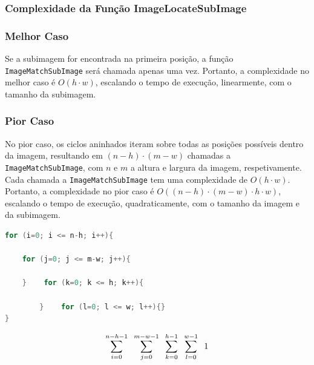\documentclass{report}
\begin{document}
\subsubsection{Complexidade da Função ImageLocateSubImage}

\subsubsection{Melhor Caso}
Se a subimagem for encontrada na primeira posição, a função \texttt{ImageMatchSubImage} será chamada apenas uma vez. 
Portanto, a complexidade no melhor caso é \(O(h \cdot w)\), escalando o tempo de execução, linearmente, com o tamanho da subimagem.

\subsubsection{Pior Caso}
No pior caso, os ciclos aninhados iteram sobre todas as posições possíveis dentro da imagem, 
resultando em \((n-h) \cdot (m-w)\) chamadas a \texttt{ImageMatchSubImage}, com \(n\) e \(m\) a altura e largura da imagem, respetivamente. 
Cada chamada a \texttt{ImageMatchSubImage} tem uma complexidade de \(O(h \cdot w)\).
Portanto, a complexidade no pior caso é \(O((n-h) \cdot (m-w) \cdot h \cdot w)\), escalando o tempo de execução, quadraticamente, 
com o tamanho da imagem e da subimagem.

\vspace{5mm}

\begingroup
\begin{lstlisting}[language=C]
for (i=0; i <= n-h; i++){
    
    for (j=0; j <= m-w; j++){
            
    }    for (k=0; k <= h; k++){
            
        }    for (l=0; l <= w; l++){}
}
\end{lstlisting}
\endgroup

\vspace{5mm}

\begin{equation}
     \sum_{i=0}^{n-h-1}  \hspace{2mm} \sum_{j=0}^{m-w-1}  \hspace{2mm} \sum_{k=0}^{h-1} \hspace{2mm}  \sum_{l=0}^{w-1} \hspace{2mm} 1 \notag
\end{equation}

\newpage
\end{document}
